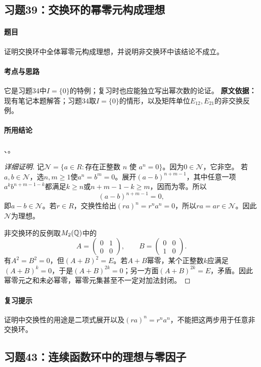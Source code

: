 \subsection{习题39：交换环的幂零元构成理想}
\paragraph{题目}
证明交换环中全体幂零元构成理想，并说明非交换环中该结论不成立。
\paragraph{考点与思路}
它是习题34中$I=\{0\}$的特例；复习时也应能独立写出幂次数的论证。
\textbf{原文依据：}现有笔记本题解答；习题34取$I=\{0\}$的情形，以及矩阵单位$E_{12},E_{21}$的非交换反例。
\paragraph{所用结论}
、。
\begin{proof}[详细证明]
记$\mathcal N=\{a\in R:\text{存在正整数 }n\text{ 使 }a^n=0\}$。因为$0\in\mathcal N$，它非空。
若$a,b\in\mathcal N$，选$n,m\geq1$使$a^n=b^m=0$。展开$(a-b)^{n+m-1}$，其中任意一项$a^k b^{n+m-1-k}$都满足$k\geq n$或$n+m-1-k\geq m$，因而为零。所以
\[
(a-b)^{n+m-1}=0,
\]
即$a-b\in\mathcal N$。若$r\in R$，交换性给出$(ra)^n=r^na^n=0$，所以$ra=ar\in\mathcal N$。因此$\mathcal N$为理想。

非交换环的反例取$M_2(\mathbb Q)$中的
\[
A=\begin{pmatrix}0&1\\0&0\end{pmatrix},\qquad
B=\begin{pmatrix}0&0\\1&0\end{pmatrix}.
\]
有$A^2=B^2=0$，但$(A+B)^2=E$。若$A+B$幂零，某个正整数$k$应满足$(A+B)^k=0$，于是$(A+B)^{2k}=0$；另一方面$(A+B)^{2k}=E$，矛盾。因此幂零元之和未必幂零，幂零元集甚至不一定对加法封闭。
\end{proof}
\paragraph{复习提示}
证明中交换性的用途是二项式展开以及$(ra)^n=r^na^n$，不能把这两步用于任意非交换环。

\subsection{习题43：连续函数环中的理想与零因子}
